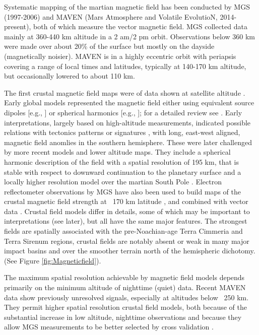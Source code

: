 Systematic mapping of the martian magnetic field has been conducted by MGS (1997-2006) and MAVEN (Mars Atmosphere and Volatile EvolutioN, 2014-present), both of which measure the vector magnetic field. MGS collected data mainly at 360-440 km altitude in a 2 am/2 pm orbit.  Observations below 360 km were made over about 20\% of the surface but mostly on the dayside (magnetically noisier). MAVEN is in a highly eccentric orbit with periapsis covering a range of local times and latitudes, typically at 140-170 km altitude, but occasionally lowered to about 110 km.\par
The first crustal magnetic field maps were of data shown at satellite altitude \citep{Acuna1999, Acuna2001, Connerney2001}.  Early global models represented the magnetic field either using equivalent source dipoles [e.g., \cite{Purucker2000, Langlais2004}] or spherical harmonics [e.g., \citet{Arkani-Hamed2001, Arkani-Hamed2002, Arkani-Hamed2004, Cain2003}]; for a detailed review see \citet{Langlais2010}. Early interpretations, largely based on high-altitude measurements, indicated possible relations with tectonics patterns or signatures \citep{Connerney1999, Nimmo2000, Connerney2005}, with long, east-west aligned, magnetic field anomlies in the southern hemisphere. These were later challenged by more recent models and lower altitude maps. They include a spherical harmonic description of the field with a spatial resolution of 195 km, that is stable with respect to downward continuation to the planetary surface \citep{Morschhauser2014} and a locally higher resolution model over the martian South Pole \citep{Plattner2015}.  Electron reflectometer observations by MGS have also been used to build maps of the crustal magnetic field strength at ~170 km latitude \citep{Lillis2008}, and combined with vector data \citep{langlais2010b}.  Crustal field models differ in details, some of which may be important to interpretations (see later), but all have the same major features. The strongest fields are spatially associated with the pre-Noachian-age Terra Cimmeria and Terra Sirenum regions, crustal fields are notably absent or weak in many major impact basins and over the smoother terrain north of the hemispheric dichotomy.(See Figure \ref{fig:Magneticfield}).

The maximum spatial resolution achievable by magnetic field models depends primarily on the minimum altitude of nighttime (quiet) data. Recent MAVEN data show previously unresolved signals, especially at altitudes below ~250 km. They permit higher spatial resolution crustal field models, both because of the substantial increase in low altitude, nighttime observations and because they allow MGS measurements to be better selected by cross validation \citep{Mittelholz2016,langlais2017AGU}.

